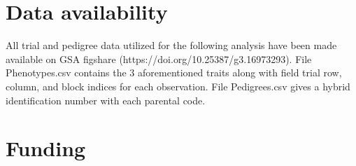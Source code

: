 \begin{refsection}
\section*{Data availability}

All trial and pedigree data utilized for the following analysis have been made available on GSA figshare (https://doi.org/10.25387/g3.16973293). File Phenotypes.csv contains the 3 aforementioned traits along with field trial row, column, and block indices for each observation. File Pedigrees.csv gives a hybrid identification number with each parental code.

\section*{Funding}


\newpage

\clearpage
\printbibliography[heading=chapterbib, resetnumbers=true] %
\clearpage

\end{refsection}
